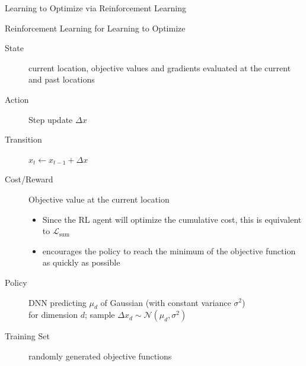 \begin{frame}[c]{Learning to Optimize via Reinforcement Learning\newline {}}

\begin{block}{Reinforcement Learning for Learning to Optimize}
\begin{description}
	\item[State] current location, objective values and gradients evaluated at the current and past locations
	\pause
	\item[Action] Step update $\Delta x$
	\pause
	\item[Transition] $x_t \leftarrow x_{t-1} + \Delta x$
	\pause
	\item[Cost/Reward] Objective value at the current location
	\begin{itemize}
	  \item Since the RL agent will optimize the cumulative cost, this is equivalent to $\mathcal{L}_{\text{sum}}$
	  \item encourages the policy to reach the minimum of the objective function as quickly as possible
	\end{itemize}
	\pause
	\item[Policy] DNN predicting $\mu_d$ of Gaussian (with constant variance $\sigma^2$)\\ for dimension $d$; sample $\Delta x_d \sim \mathcal{N}(\mu_d, \sigma^2)$
	\pause
	\item[Training Set] randomly generated objective functions
\end{description}
\end{block}

\end{frame}
